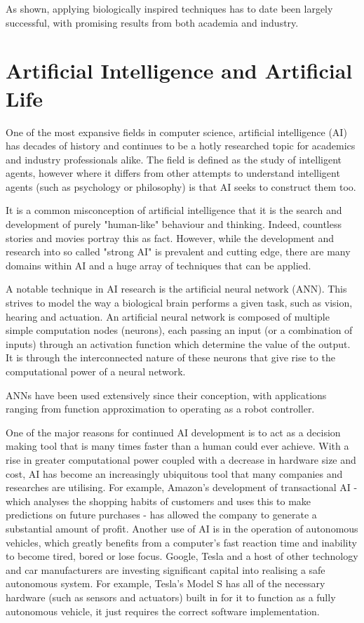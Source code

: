 As shown, applying biologically inspired techniques has to date been largely successful, with promising results from both academia and industry. 

\section{Artificial Intelligence and Artificial Life}
One of the most expansive fields in computer science, artificial intelligence (AI) has decades of history and continues to be a hotly researched topic for academics and industry professionals alike. The field is defined as the study of intelligent agents, however where it differs from other attempts to understand intelligent agents (such as psychology or philosophy) is that AI seeks to construct them too. \cite{russell-norvig}

It is a common misconception of artificial intelligence that it is the search and development of purely "human-like" behaviour and thinking. Indeed, countless stories and movies portray this as fact. However, while the development and research into so called "strong AI" is prevalent and cutting edge, there are many domains within AI and a huge array of techniques that can be applied. 

A notable technique in AI research is the artificial neural network (ANN). This strives to model the way a biological brain performs a given task, such as vision, hearing and actuation. An artificial neural network is composed of multiple simple computation nodes (neurons), each passing  an input (or a combination of inputs) through an activation function which determine the value of the output. It is through the interconnected nature of these neurons that give rise to the computational power of a neural network. \cite{haykin2009neural} 

ANNs have been used extensively since their conception, with applications ranging from function approximation to operating as a robot controller.

One of the major reasons for continued AI development is to act as a decision making tool that is many times faster than a human could ever achieve. With a rise in greater computational power coupled with a decrease in hardware size and cost, AI has become an increasingly ubiquitous tool that many companies and researches are utilising. For example, Amazon's development of transactional AI - which analyses the shopping habits of customers and uses this to make predictions on future purchases - has allowed the company to generate a substantial amount of profit. Another use of AI is in the operation of autonomous vehicles, which greatly benefits from a computer's fast reaction time and inability to become tired, bored or lose focus. Google, Tesla and a host of other technology and car manufacturers are investing significant capital into realising a safe autonomous system. For example, Tesla's Model S has all of the necessary hardware (such as sensors and actuators) built in for it to function as a fully autonomous vehicle, it just requires the correct software implementation. \cite{tesla}

